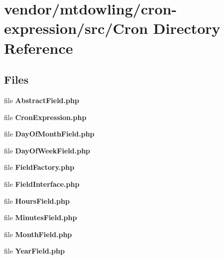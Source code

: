 \section{vendor/mtdowling/cron-\/expression/src/\+Cron Directory Reference}
\label{dir_c9f4983977160d85ed8966f154f00bd6}
\subsection*{Files}
\begin{DoxyCompactItemize}
\item 
file {\bf Abstract\+Field.\+php}
\item 
file {\bf Cron\+Expression.\+php}
\item 
file {\bf Day\+Of\+Month\+Field.\+php}
\item 
file {\bf Day\+Of\+Week\+Field.\+php}
\item 
file {\bf Field\+Factory.\+php}
\item 
file {\bf Field\+Interface.\+php}
\item 
file {\bf Hours\+Field.\+php}
\item 
file {\bf Minutes\+Field.\+php}
\item 
file {\bf Month\+Field.\+php}
\item 
file {\bf Year\+Field.\+php}
\end{DoxyCompactItemize}
